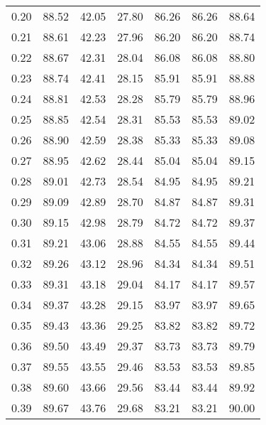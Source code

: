 \begin{tabular}{|c|c|c|c|c|c|c|}
      0.20 &     88.52 &     42.05 &      27.80 &   86.26 &      86.26 &         88.64 \\
      0.21 &     88.61 &     42.23 &      27.96 &   86.20 &      86.20 &         88.74 \\
      0.22 &     88.67 &     42.31 &      28.04 &   86.08 &      86.08 &         88.80 \\
      0.23 &     88.74 &     42.41 &      28.15 &   85.91 &      85.91 &         88.88 \\
      0.24 &     88.81 &     42.53 &      28.28 &   85.79 &      85.79 &         88.96 \\
      0.25 &     88.85 &     42.54 &      28.31 &   85.53 &      85.53 &         89.02 \\
      0.26 &     88.90 &     42.59 &      28.38 &   85.33 &      85.33 &         89.08 \\
      0.27 &     88.95 &     42.62 &      28.44 &   85.04 &      85.04 &         89.15 \\
      0.28 &     89.01 &     42.73 &      28.54 &   84.95 &      84.95 &         89.21 \\
      0.29 &     89.09 &     42.89 &      28.70 &   84.87 &      84.87 &         89.31 \\
      0.30 &     89.15 &     42.98 &      28.79 &   84.72 &      84.72 &         89.37 \\
      0.31 &     89.21 &     43.06 &      28.88 &   84.55 &      84.55 &         89.44 \\
      0.32 &     89.26 &     43.12 &      28.96 &   84.34 &      84.34 &         89.51 \\
      0.33 &     89.31 &     43.18 &      29.04 &   84.17 &      84.17 &         89.57 \\
      0.34 &     89.37 &     43.28 &      29.15 &   83.97 &      83.97 &         89.65 \\
      0.35 &     89.43 &     43.36 &      29.25 &   83.82 &      83.82 &         89.72 \\
      0.36 &     89.50 &     43.49 &      29.37 &   83.73 &      83.73 &         89.79 \\
      0.37 &     89.55 &     43.55 &      29.46 &   83.53 &      83.53 &         89.85 \\
      0.38 &     89.60 &     43.66 &      29.56 &   83.44 &      83.44 &         89.92 \\
      0.39 &     89.67 &     43.76 &      29.68 &   83.21 &      83.21 &         90.00 \\

\end{tabular}

